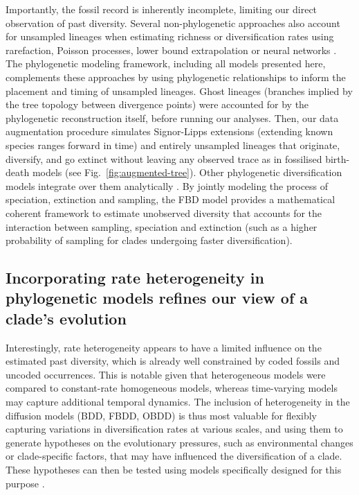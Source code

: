 \documentclass[oupdraft]{sysbio}
\newcommand{\revised}[1]{{\color{blue} #1}}
\begin{document}
Importantly, the fossil record is inherently incomplete, limiting our direct observation of past diversity. \revised{Several non-phylogenetic approaches also account for unsampled lineages when estimating richness or diversification rates using rarefaction, Poisson processes, lower bound extrapolation or neural networks \citep{alroy_dynamics_2008, foote_inferring_2001, starrfelt_how_2016, flannery-sutherland_global_2022, cooper_deepdive_2024}.} \revised{The phylogenetic modeling framework, including all models presented here, complements these approaches by using phylogenetic relationships to inform the placement and timing of unsampled lineages. Ghost lineages (branches implied by the tree topology between divergence points) were accounted for by the phylogenetic reconstruction itself, before running our analyses. Then, our data augmentation procedure simulates Signor-Lipps extensions (extending known species ranges forward in time) and entirely unsampled lineages that originate, diversify, and go extinct without leaving any observed trace as in fossilised birth-death models (see Fig.~\ref{fig:augmented-tree}). Other phylogenetic diversification models integrate over them analytically \citep{stadler_sampling-through-time_2010}. By jointly modeling the process of speciation, extinction and sampling, the FBD model provides a mathematical coherent framework to estimate unobserved diversity that accounts for the interaction between sampling, speciation and extinction (such as a higher probability of sampling for clades undergoing faster diversification).}

\subsection{\revised{Incorporating rate heterogeneity in phylogenetic models refines our view of a clade's evolution}}

Interestingly, rate heterogeneity appears to have a limited influence on the estimated past diversity, which is already well constrained by \revised{coded} fossils and \revised{uncoded} occurrences. This is notable given that heterogeneous models were compared to constant-rate homogeneous models, whereas time-varying models may capture additional temporal dynamics. The inclusion of heterogeneity in the diffusion models (BDD, FBDD, OBDD) is thus most valuable for flexibly capturing variations in diversification rates at various scales, and using them to generate hypotheses on the evolutionary pressures, such as environmental changes or clade-specific factors, that may have influenced the diversification of a clade. These hypotheses can then be tested using models specifically designed for this purpose \citep{morlon_phylogenetic_2024}.
\end{document}

